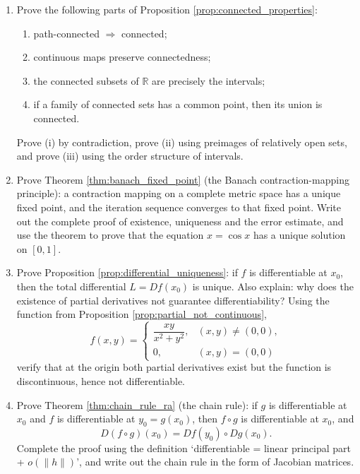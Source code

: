 \begin{enumerate}[leftmargin=3em, label=\textbf{Exercise \arabic*}]
    \item Prove the following parts of Proposition \ref{prop:connected_properties}:
    \begin{enumerate}[label=(\roman*)]
        \item path-connected $\Rightarrow$ connected;
        \item continuous maps preserve connectedness;
        \item the connected subsets of $\mathbb{R}$ are precisely the intervals;
        \item if a family of connected sets has a common point, then its union is connected.
    \end{enumerate}
    Prove (i) by contradiction, prove (ii) using preimages of relatively open sets,
    and prove (iii) using the order structure of intervals.

    \item Prove Theorem \ref{thm:banach_fixed_point} (the Banach contraction-mapping principle):
    a contraction mapping on a complete metric space has a unique fixed point, and the iteration sequence converges to that fixed point.
    Write out the complete proof of existence, uniqueness and the error estimate,
    and use the theorem to prove that the equation $x=\cos x$ has a unique solution on $[0,1]$.

    \item Prove Proposition \ref{prop:differential_uniqueness}:
    if $f$ is differentiable at $x_0$, then the total differential $L=Df(x_0)$ is unique.
    Also explain: why does the existence of partial derivatives not guarantee differentiability?
    Using the function from Proposition \ref{prop:partial_not_continuous},
    \[
    f(x,y)=\begin{cases}
    \dfrac{xy}{x^2+y^2}, & (x,y)\neq(0,0),\\
    0, & (x,y)=(0,0)
    \end{cases}
    \]
    verify that at the origin both partial derivatives exist but the function is discontinuous, hence not differentiable.

    \item Prove Theorem \ref{thm:chain_rule_ra} (the chain rule):
    if $g$ is differentiable at $x_0$ and $f$ is differentiable at $y_0=g(x_0)$,
    then $f\circ g$ is differentiable at $x_0$, and
    \[
    D(f\circ g)(x_0)=Df(y_0)\circ Dg(x_0).
    \]
    Complete the proof using the definition `differentiable = linear principal part + $o(\|h\|)$',
    and write out the chain rule in the form of Jacobian matrices.


\end{enumerate}
